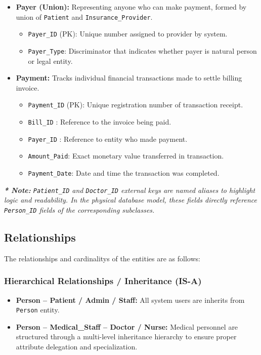 \documentclass[12pt,a4paper]{article}
\begin{document}
\begin{itemize}[label=\textbf{--}]
	\item \textbf{Payer (Union):} Representing anyone who can make payment, formed by union of \texttt{Patient} and \texttt{Insurance\_Provider}.
	      \begin{itemize}[label=$\bullet$]
		      \item \texttt{Payer\_ID} (PK): Unique number assigned to provider by system.
		      \item \texttt{Payer\_Type}: Discriminator that indicates whether payer is natural person or legal entity.
	      \end{itemize}

	\item \textbf{Payment:} Tracks individual financial transactions made to settle billing invoice.
	      \begin{itemize}[label=$\bullet$]
		      \item \texttt{Payment\_ID} (PK): Unique registration number of transaction receipt.
		      \item \texttt{Bill\_ID} : Reference to the invoice being paid.
		      \item \texttt{Payer\_ID} : Reference to entity who made payment.
		      \item \texttt{Amount\_Paid}: Exact monetary value transferred in transaction.
		      \item \texttt{Payment\_Date}: Date and time the transaction was completed.
	      \end{itemize}


\end{itemize}
\vspace{0.2cm}
\noindent \footnotesize{\textit{\textbf{* Note:} \texttt{Patient\_ID} and \texttt{Doctor\_ID} external keys  are named aliases to highlight logic and readability. In the physical database model, these fields directly reference \texttt{Person\_ID} fields of the corresponding subclasses.}}
\subsection{Relationships}

The relationships and cardinalitys of the entities are as follows:

\subsubsection*{Hierarchical Relationships / Inheritance (IS-A)}
\begin{itemize}[label=\textbf{--}]

	\item \textbf{Person -- Patient / Admin / Staff:} All system users are inherits from \texttt{Person} entity.
	\item \textbf{Person -- Medical\_Staff -- Doctor / Nurse:} Medical personnel are structured through a multi-level inheritance hierarchy to ensure proper attribute delegation and specialization.
\end{itemize}
\end{document}
